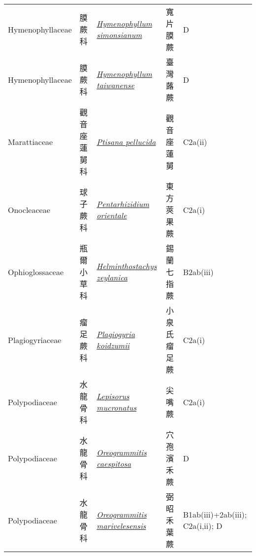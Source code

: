 {\begin{longtable}{p{2.5cm}p{2.5cm}p{4.5cm}p{2.5cm}p{3cm}}
    Hymenophyllaceae & 膜蕨科 & \href{http://www.theplantlist.org/tpl1.1/search?q=Hymenophyllum+simonsianum}{\textit{Hymenophyllum simonsianum} } & 寬片膜蕨 & D \index{Hymenophyllum@\textit{Hymenophyllum}!simonsianum@\textit{simonsianum}}  \index{寬片膜蕨} \\
    Hymenophyllaceae & 膜蕨科 & \href{http://www.theplantlist.org/tpl1.1/search?q=Hymenophyllum+taiwanense}{\textit{Hymenophyllum taiwanense} } & 臺灣蕗蕨 & D \index{Hymenophyllum@\textit{Hymenophyllum}!taiwanense@\textit{taiwanense}}  \index{臺灣蕗蕨} \\
    Marattiaceae & 觀音座蓮舅科 & \href{http://www.theplantlist.org/tpl1.1/search?q=Ptisana+pellucida}{\textit{Ptisana pellucida} } & 觀音座蓮舅 & C2a(ii) \index{Ptisana@\textit{Ptisana}!pellucida@\textit{pellucida}}  \index{觀音座蓮舅} \\
    Onocleaceae & 球子蕨科 & \href{http://www.theplantlist.org/tpl1.1/search?q=Pentarhizidium+orientale}{\textit{Pentarhizidium orientale} } & 東方莢果蕨 & C2a(i) \index{Pentarhizidium@\textit{Pentarhizidium}!orientale@\textit{orientale}}  \index{東方莢果蕨} \\
    Ophioglossaceae & 瓶爾小草科 & \href{http://www.theplantlist.org/tpl1.1/search?q=Helminthostachys+zeylanica}{\textit{Helminthostachys zeylanica} } & 錫蘭七指蕨 & B2ab(iii) \index{Helminthostachys@\textit{Helminthostachys}!zeylanica@\textit{zeylanica}}  \index{錫蘭七指蕨} \\
    Plagiogyriaceae & 瘤足蕨科 & \href{http://www.theplantlist.org/tpl1.1/search?q=Plagiogyria+koidzumii}{\textit{Plagiogyria koidzumii} } & 小泉氏瘤足蕨 & C2a(i) \index{Plagiogyria@\textit{Plagiogyria}!koidzumii@\textit{koidzumii}}  \index{小泉氏瘤足蕨} \\
    Polypodiaceae & 水龍骨科 & \href{http://www.theplantlist.org/tpl1.1/search?q=Lepisorus+mucronatus}{\textit{Lepisorus mucronatus} } & 尖嘴蕨 & C2a(i) \index{Lepisorus@\textit{Lepisorus}!mucronatus@\textit{mucronatus}}  \index{尖嘴蕨} \\
    Polypodiaceae & 水龍骨科 & \href{http://www.theplantlist.org/tpl1.1/search?q=Oreogrammitis+caespitosa}{\textit{Oreogrammitis caespitosa} } & 穴孢濱禾蕨 & D \index{Oreogrammitis@\textit{Oreogrammitis}!caespitosa@\textit{caespitosa}}  \index{穴孢濱禾蕨} \\
    Polypodiaceae & 水龍骨科 & \href{http://www.theplantlist.org/tpl1.1/search?q=Oreogrammitis+marivelesensis}{\textit{Oreogrammitis marivelesensis} } & 弼昭禾葉蕨 & B1ab(iii)+2ab(iii); C2a(i,ii); D \index{Oreogrammitis@\textit{Oreogrammitis}!marivelesensis@\textit{marivelesensis}}  \index{弼昭禾葉蕨} \\

\end{longtable}}

